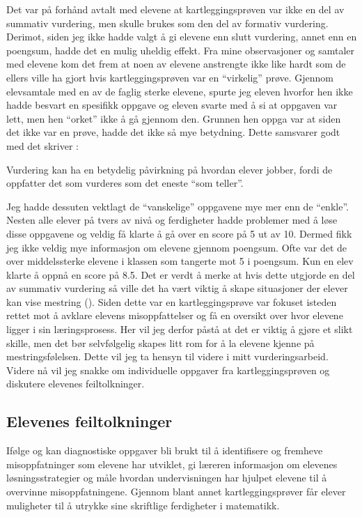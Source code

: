 \documentclass[main.tex]{subfiles}
\begin{document}
Det var på forhånd avtalt med elevene at kartleggingsprøven var ikke en del av summativ vurdering, men skulle brukes
som den del av formativ vurdering. Derimot, siden jeg ikke hadde valgt å gi elevene enn slutt vurdering, annet enn en 
poengsum, hadde det en mulig uheldig effekt. Fra mine observasjoner og samtaler med elevene kom det frem at noen av 
elevene anstrengte ikke like hardt som de ellers ville ha gjort hvis kartleggingsprøven var en ``virkelig'' prøve.
Gjennom elevsamtale med en av de faglig sterke elevene, spurte jeg eleven hvorfor hen ikke hadde besvart en spesifikk 
oppgave og eleven svarte med å si at oppgaven var lett, men hen ``orket'' ikke å gå gjennom den. Grunnen hen oppga 
var at siden det ikke var en prøve, hadde det ikke så mye betydning. Dette samsvarer godt med det  
skriver : 
\begin{displayquote}
Vurdering kan ha en betydelig påvirkning på hvordan elever jobber, fordi de oppfatter det som 
vurderes som det eneste ``som teller''.
\end{displayquote}
Jeg hadde dessuten vektlagt de ``vanskelige'' oppgavene mye mer enn de ``enkle''. Nesten alle elever på tvers av nivå og 
ferdigheter hadde problemer med å løse disse oppgavene og veldig få klarte å gå over en score på 5 ut av 10. Dermed 
fikk jeg ikke veldig mye informasjon om elevene gjennom poengsum. Ofte var det de over middelssterke elevene i klassen 
som tangerte mot 5 i poengsum. Kun en elev klarte å oppnå en score på 8.5. Det er verdt å merke at hvis dette utgjorde
en del av summativ vurdering så ville det ha vært viktig å skape situasjoner der elever kan vise mestring 
(). 
Siden dette var en kartleggingsprøve var fokuset isteden rettet mot å avklare elevens misoppfattelser og få en oversikt 
over hvor elevene ligger i sin læringsprosess. Her vil jeg derfor påstå at det er viktig å gjøre et slikt skille, men 
det bør selvfølgelig skapes litt rom for å la elevene kjenne på mestringsfølelsen. Dette vil jeg ta hensyn til videre i
mitt vurderingsarbeid. Videre nå vil jeg snakke om individuelle oppgaver fra kartleggingsprøven og diskutere 
elevenes feiltolkninger.

\subsection*{Elevenes feiltolkninger}
Ifølge  og  kan diagnostiske oppgaver bli brukt til å identifisere og 
fremheve misoppfatninger som elevene har utviklet, gi læreren informasjon om elevenes løsningsstrategier og måle hvordan 
undervisningen har hjulpet elevene til å overvinne misoppfatningene. Gjennom blant annet kartleggingsprøver får elever 
muligheter til å utrykke sine skriftlige ferdigheter i matematikk.
\end{document}
